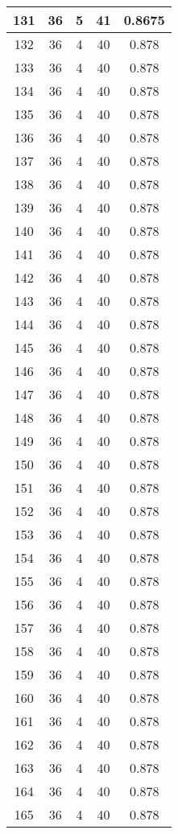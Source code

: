 \documentclass[letterpaper, 12pt]{article}
\begin{document}
\begin{longtable}{|c|c|c|c|c|}
\hline
131 & 36 & 5 & 41 & 0.8675 \\
\hline
132 & 36 & 4 & 40 & 0.878 \\
\hline
133 & 36 & 4 & 40 & 0.878 \\
\hline
134 & 36 & 4 & 40 & 0.878 \\
\hline
135 & 36 & 4 & 40 & 0.878 \\
\hline
136 & 36 & 4 & 40 & 0.878 \\
\hline
137 & 36 & 4 & 40 & 0.878 \\
\hline
138 & 36 & 4 & 40 & 0.878 \\
\hline
139 & 36 & 4 & 40 & 0.878 \\
\hline
140 & 36 & 4 & 40 & 0.878 \\
\hline
141 & 36 & 4 & 40 & 0.878 \\
\hline
142 & 36 & 4 & 40 & 0.878 \\
\hline
143 & 36 & 4 & 40 & 0.878 \\
\hline
144 & 36 & 4 & 40 & 0.878 \\
\hline
145 & 36 & 4 & 40 & 0.878 \\
\hline
146 & 36 & 4 & 40 & 0.878 \\
\hline
147 & 36 & 4 & 40 & 0.878 \\
\hline
148 & 36 & 4 & 40 & 0.878 \\
\hline
149 & 36 & 4 & 40 & 0.878 \\
\hline
150 & 36 & 4 & 40 & 0.878 \\
\hline
151 & 36 & 4 & 40 & 0.878 \\
\hline
152 & 36 & 4 & 40 & 0.878 \\
\hline
153 & 36 & 4 & 40 & 0.878 \\
\hline
154 & 36 & 4 & 40 & 0.878 \\
\hline
155 & 36 & 4 & 40 & 0.878 \\
\hline
156 & 36 & 4 & 40 & 0.878 \\
\hline
157 & 36 & 4 & 40 & 0.878 \\
\hline
158 & 36 & 4 & 40 & 0.878 \\
\hline
159 & 36 & 4 & 40 & 0.878 \\
\hline
160 & 36 & 4 & 40 & 0.878 \\
\hline
161 & 36 & 4 & 40 & 0.878 \\
\hline
162 & 36 & 4 & 40 & 0.878 \\
\hline
163 & 36 & 4 & 40 & 0.878 \\
\hline
164 & 36 & 4 & 40 & 0.878 \\
\hline
165 & 36 & 4 & 40 & 0.878 \\

\end{longtable}
\end{document}
